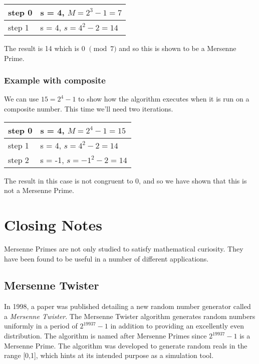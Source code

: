 \begin{tabular}{ll}
step 0&s = 4, $M = 2^3 -1 = 7$\\\hline
step 1&s = 4, $s = 4^2 - 2 = 14$
\end{tabular}

The result is 14 which is 0 $\pmod{7}$ and so this is shown to be a Mersenne Prime.

\subsubsection{Example with composite} 

We can use $15 = 2^4 - 1$ to show how the algorithm executes when it is run on a composite number. This time  we'll need two iterations.

\begin{tabular}{ll}
step 0&s = 4, $M = 2^4 -1 = 15$\\\hline
step 1&s = 4, $s = 4^2 -2 = 14$\\
step 2&s = -1, $s = -1^2 -2 = 14$
\end{tabular}

The result in this case is not congruent to 0, and so we have shown that this is not a Mersenne Prime.
\section{Closing Notes}

Mersenne Primes are not only studied to satisfy mathematical curiosity.  They have been found to be useful in a number of different applications.  

\subsection{Mersenne Twister}
In 1998, a paper was published detailing a new random number generator called a \emph{Mersenne Twister}.  The Mersenne Twister algorithm generates random numbers uniformly in a period of $2^{19937} -1$ in addition to providing an excellently even distribution\cite{mt}. The algorithm is named after Mersenne Primes since $2^{19937}-1$ is a Mersenne Prime.  The algorithm was developed to generate random reals in the range [0,1], which hints at its intended purpose as a simulation tool. 

